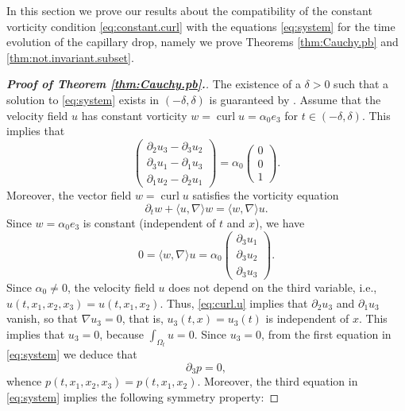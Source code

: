 \documentclass[10pt,reqno,a4paper]{article}
\numberwithin{equation}{section}
\theoremstyle{plain}
\theoremstyle{definition}
\newcommand{\mD}{\mathcal{D}}
\newcommand{\la}{\langle}
\newcommand{\ra}{\rangle}
\newcommand{\pa}{\partial}
\newcommand{\grad}{\nabla}
\newcommand{\curl}{\operatorname{curl}}
\begin{document}
In this section we prove our results about the compatibility of the 
constant vorticity condition \eqref{eq:constant.curl} 
with the equations \eqref{eq:system} for the time evolution of the capillary drop, 
namely we prove Theorems \ref{thm:Cauchy.pb} and \ref{thm:not.invariant.subset}.


\begin{proof}[\textbf{Proof of Theorem \ref{thm:Cauchy.pb}.}]
The existence of a $\delta>0$ such that a solution to \eqref{eq:system} exists in $(-\delta,\delta)$
is guaranteed by \cite[Theorem 1.1]{CS}.
Assume that
the velocity field $u$ has constant vorticity $ w=\curl u= \alpha_0 e_3$ for $t\in (-\delta, \delta)$. This implies that 
\begin{equation}\label{eq:curl.u}
\begin{pmatrix}
\pa_2u_3-\pa_3u_2 
\\
\pa_3 u_1 - \pa_1 u_3
\\
\pa_1 u_2 - \pa_2u_1
\end{pmatrix}
= \alpha_0 
\begin{pmatrix}
0\\ 0\\ 1
\end{pmatrix}.
\end{equation}
Moreover, the vector field $w= \curl u$ satisfies the vorticity equation 
\[
\pa_t w + \la u , \grad \ra w  %
= \langle w, \nabla \rangle u.
\]
Since $w = \alpha_0 e_3$ is constant (independent of $t$ and $x$), we have
\begin{equation} \label{eq:vort.equation}
0=\langle w, \nabla \rangle u =\alpha_0
\begin{pmatrix}
\pa_3 u_1 \\
\pa_3 u_2 \\
\pa_3 u_3
\end{pmatrix}.
\end{equation}
Since $\alpha_0\not =0$,
the velocity field $u$ does not depend on the third variable, i.e., $u(t,x_1,x_2,x_3)=u(t,x_1,x_2)$. 
Thus, \eqref{eq:curl.u} implies that $\pa_2 u_3$ and $\pa_1 u_3$ vanish, 
so that $\grad u_3 = 0$, that is, 
$u_3(t,x) = u_3(t)$ is independent of $x$.  
This implies that $u_3=0$, because $\int_{\Omega_t}u=0$. 
Since $u_3=0$, from the first equation in \eqref{eq:system} we deduce that
\begin{equation} \label{eq:pressure.equation}
\pa_3 p=0,
\end{equation} 
whence $p(t,x_1,x_2,x_3)=p(t,x_1,x_2)$.  
Moreover, the third equation in \eqref{eq:system} implies the following symmetry property:

\end{proof}
\end{document}
